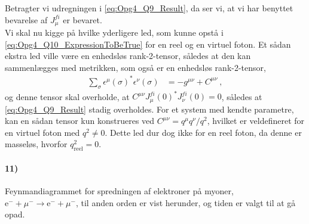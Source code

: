 \documentclass[../main.tex]{subfiles}
\begin{document}
Betragter vi udregningen i \cref{eq:Opg4_Q9_Result}, da ser vi, at vi har benyttet bevarelse af $J_\mu^{fi}$ er bevaret.
\\

Vi skal nu kigge på hvilke yderligere led, som kunne opstå i \cref{eq:Opg4_Q10_ExpressionToBeTrue} for en reel og en virtuel foton. Et sådan ekstra led ville være en enhedsløs rank-2-tensor, således at den kan sammenlægges med metrikken, som også er en enhedsløs rank-2-tensor,
\begin{align}
    \sum_\sigma \epsilon^\mu(\sigma)^* \epsilon^\nu(\sigma) &= -g^{\mu\nu} + C^{\mu\nu} \: ,
\end{align}
og denne tensor skal overholde, at $C^{\mu\nu} J_\mu^{fi}(0)^* J_\nu^{fi}(0) = 0$, således at \cref{eq:Opg4_Q9_Result} stadig overholdes. For et system med kendte parametre, kan en sådan tensor kun konstrueres ved $C^{\mu\nu} = q^\mu q^\nu / q^2$, hvilket er veldefineret for en virtuel foton med $q^2 \ne 0$. Dette led dur dog ikke for en reel foton, da denne er masseløs, hvorfor $q_{\mathrm{reel}}^2 = 0$.



\paragraph[11) Feynmandiagram for spredning af elektroner på myoner]{\textbf{11)}}

Feynmandiagrammet for spredningen af elektroner på myoner, $\mathrm{e}^- + \mu^- \rightarrow \mathrm{e}^- + \mu^-$, til anden orden er vist herunder, og tiden er valgt til at gå opad.

\end{document}
